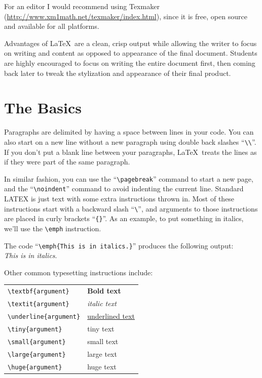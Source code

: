 \documentclass[12pt,a4paper]{article} %
\begin{document}
For an editor I would recommend using Texmaker (\url{http://www.xm1math.net/texmaker/index.html}), since it is free, open source and available for all platforms.

Advantages of \LaTeX\  are a clean, crisp output while allowing the writer to focus on writing and content as opposed to appearance of the final document. Students are highly encouraged to focus on writing the entire document first, then coming back later to tweak the stylization and appearance of their final product.





\section{The Basics}

Paragraphs are delimited by having a space between lines in your code. You can also start on a new line without a new paragraph using double back slashes “{\verb|\\|}”. If you don’t put a blank line between your paragraphs, \LaTeX\  treats the lines as if they were part of the same paragraph.  

In similar fashion, you can use the “\verb|\pagebreak|” command to start a new page, and the “\verb|\noindent|” command to avoid indenting the current line.
Standard LATEX is just text with some extra instructions thrown in. Most of these instructions start with a backward slash “\verb|\|”, and arguments to those instructions are placed in curly brackets “\verb|{}|”. As an example, to put something in italics, we’ll use the \verb|\emph| instruction.

The code “\verb|\emph{This is in italics.}|” produces the following output: \\
\emph{This is in italics}.


Other common typesetting instructions include:

\begin{tabular}{ll}
\verb|\textbf{argument}| & \textbf{Bold text} \\
\verb|\textit{argument}| &  \textit{italic text} \\
\verb|\underline{argument}| &  \underline{underlined text} \\
\verb|\tiny{argument}| & \tiny{tiny text} \\
\verb|\small{argument}| & \small{small text} \\ 
\verb|\large{argument}| & \large{large text} \\
\verb|\huge{argument}| & \huge{huge text}
\end{tabular}
\end{document}
